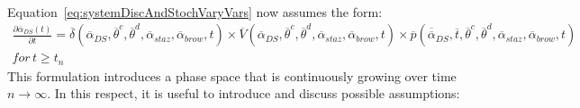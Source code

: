 \\Equation~\ref{eq:systemDiscAndStochVaryVars} now assumes the form:
\begin{equation}
\label{eq:systemDiscAndStochVaryVarsExpanded}
\begin{matrix}
\frac{\partial  \overline{\alpha }_{DS}\left ( t \right )}{\partial t}=  \overline{\delta}\left ( \overline{\alpha }_{DS}, \overline{\theta}^{c},\overline{\theta}^{d},\overline{\alpha}_{staz},\overline{\alpha}_{brow},t \right ) \times \overline{V}\left ( \overline{\alpha }_{DS}, \overline{\theta}^{c},\overline{\theta}^{d},\overline{\alpha}_{staz},\overline{\alpha}_{brow},t \right ) \times \overline{p}\left ( \overline{\overline{\alpha}}_{DS},\overline{t},\overline{\theta}^{c},\overline{\theta}^{d},\overline{\alpha}_{staz},\overline{\alpha}_{brow},t  \right ) \\ \! \! \! \! \! \! \! \! \! \! \! \! \! \! \! \! \! \! \! \! \! \! \! \! \! \! \! \! \! \! \! \! \! \! \! \! \! \! \! \! \! \! \! \! \! \! \! \! \! \! \! \! \! \! \! \! \! \! \! \! \! \! \! \! \! \! \! \! \! \! \! \! \! \! \! \! \! \! \! \! \! \! \! \! \! \! \! \! \! \! \! \! \! \! \! \! \! \! \! \! \! \! \! \! \! \! \! \! \! \! \! \! \! \! \! \! \! \! \! \! \! \! \! \! \! \! \! \! \! \! \! \! \! \! \! \! \! \! \! \! \! \! \! \! \! \! \! \! \! \! \! \! \! \! \! \! \! \! \! \! \! \! \! \! \! \! \! \!  
for \, t\geq t_{n}
\end{matrix}
\end{equation}
This formulation introduces a phase space that is continuously growing over time $n \rightarrow \infty$. In this respect, it is useful to introduce and discuss possible assumptions:
